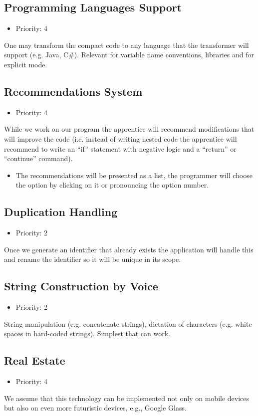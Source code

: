 \subsection{Programming Languages Support}
\begin{itemize}
	\item Priority: 4
\end{itemize}
One may transform the compact code to any language that the transformer will support (e.g. Java, C\#). Relevant for variable name conventions, libraries and for explicit mode.
\subsection{Recommendations System}
\begin{itemize}
	\item Priority: 4
\end{itemize}
While we work on our program the apprentice will recommend modifications that will improve the code (i.e. instead of writing nested code the apprentice will recommend to write an “if” statement with negative logic and a “return” or “continue” command).
\begin{itemize}
	\item The recommendations will be presented as a list, the programmer will choose the option by clicking on it or pronouncing the option number.
\end{itemize}
\subsection{Duplication Handling}
\begin{itemize}
	\item Priority: 2
\end{itemize}
Once we generate an identifier that already exists the application will handle this and rename the identifier so it will be unique in its scope.
\subsection{String Construction by Voice}
\begin{itemize}
	\item Priority: 2
\end{itemize}
String manipulation (e.g. concatenate strings), dictation of characters (e.g. white spaces in hard-coded strings). Simplest that can work.
\subsection{Real Estate}
\begin{itemize}
	\item Priority: 4
\end{itemize}
We assume that this technology can be implemented not only on mobile devices but also on even more futuristic devices, e.g., Google Glass.
